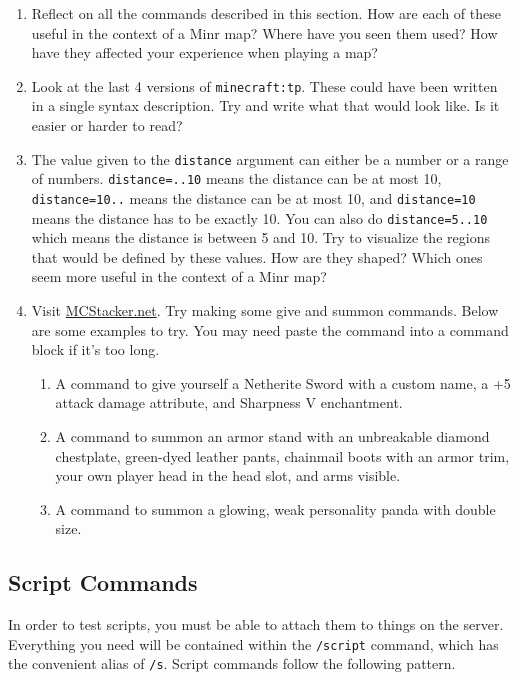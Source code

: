 \documentclass[oneside]{book}
\begin{document}
\begin{thinkbox}
\begin{enumerate}
    \item Reflect on all the commands described in this section. How are each of these useful in the context of a Minr map? Where have you seen them used? How have they affected your experience when playing a map?
    \item Look at the last 4 versions of \texttt{minecraft:tp}. These could have been written in a single syntax description. Try and write what that would look like. Is it easier or harder to read?
    \item The value given to the \texttt{distance} argument can either be a number or a range of numbers. \texttt{distance=..10} means the distance can be at most 10, \texttt{distance=10..} means the distance can be at most 10, and \texttt{distance=10} means the distance has to be exactly 10. You can also do \texttt{distance=5..10} which means the distance is between 5 and 10. Try to visualize the regions that would be defined by these values. How are they shaped? Which ones seem more useful in the context of a Minr map?
    \item Visit \href{https://mcstacker.net/}{MCStacker.net}. Try making some give and summon commands. Below are some examples to try. You may need paste the command into a command block if it's too long.
    \begin{enumerate}
        \item A command to give yourself a Netherite Sword with a custom name, a +5 attack damage attribute, and Sharpness V enchantment.
        \item A command to summon an armor stand with an unbreakable diamond chestplate, green-dyed leather pants, chainmail boots with an armor trim, your own player head in the head slot, and arms visible.
        \item A command to summon a glowing, weak personality panda with double size.
    \end{enumerate}
    
\end{enumerate}
\end{thinkbox}

\subsection{Script Commands} \label{subsec:script-commands}

In order to test scripts, you must be able to attach them to things on the server. Everything you need will be contained within the \texttt{/script} command, which has the convenient alias of \texttt{/s}. Script commands follow the following pattern.
\end{document}
